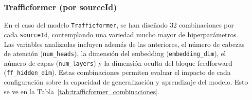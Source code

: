 \subsubsection*{Trafficformer (por sourceId)}

En el caso del modelo \texttt{Trafficformer}, se han diseñado 32 combinaciones por cada \texttt{sourceId}, contemplando una variedad mucho mayor de hiperparámetros. Las variables analizadas incluyen además de las anteriores, el número de cabezas de atención (\texttt{num\_heads}), la dimensión del embedding (\texttt{embedding\_dim}), el número de capas (\texttt{num\_layers}) y la dimensión oculta del bloque feedforward (\texttt{ff\_hidden\_dim}). Estas combinaciones permiten evaluar el impacto de cada configuración sobre la capacidad de generalización y aprendizaje del modelo. Esto se ve en la Tabla~\ref{tab:trafficformer_combinaciones}.

